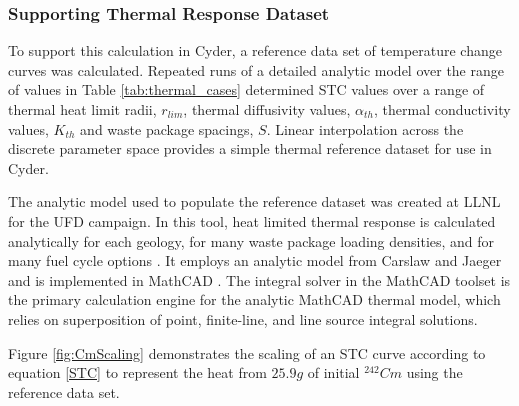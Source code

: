 \subsubsection{Supporting Thermal Response Dataset}
To support this calculation in Cyder, a reference data set of temperature change 
curves was calculated. Repeated runs of a detailed analytic model over the range of values in Table 
\ref{tab:thermal_cases} determined \gls{STC} values over a range of thermal 
heat limit radii, $r_{lim}$, thermal diffusivity values, $\alpha_{th}$,
thermal conductivity values, $K_{th}$ and waste package spacings, $S$. Linear 
interpolation across the discrete parameter space provides a simple thermal 
reference dataset for use in Cyder.



The analytic model used to populate the reference dataset was created at 
\gls{LLNL} for the \gls{UFD} campaign. In this tool, heat limited thermal 
response is calculated analytically for each geology, for many waste package 
loading densities, and for many fuel cycle options \cite{hardin_generic_2011, 
greenberg_investigations_2012, greenberg_application_2012}. It employs an 
analytic model from Carslaw and Jaeger and is implemented in MathCAD 
\cite{carslaw_conduction_1959, ptc_mathcad_2010}.  The integral solver in the 
MathCAD toolset is the primary calculation engine for the analytic MathCAD 
thermal model, which relies on superposition of point, finite-line, and line 
source integral solutions.  

%

Figure \ref{fig:CmScaling} demonstrates the scaling of an STC curve according to 
equation \eqref{STC} to represent the heat from $25.9g$ of initial $^{242}Cm$ using 
the reference data set. 

